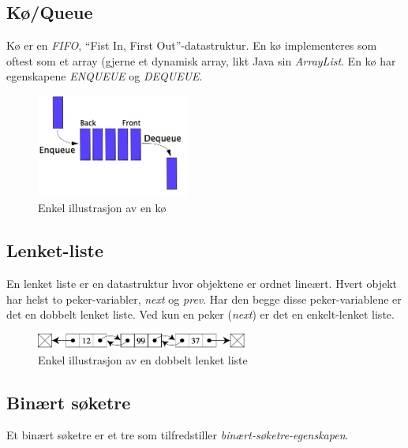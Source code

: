 \documentclass[a4paper, norsk,  10pt]{article}
\begin{document}
{{\subsection{Kø/Queue}

Kø er en \textit{FIFO}, ``Fist In, First Out''-datastruktur. En kø implementeres som oftest som et array (gjerne et dynamisk array, likt Java sin \textit{ArrayList}. En kø har egenskapene \textit{ENQUEUE} og \textit{DEQUEUE}.

\begin{figure}[hbt]
    \begin{center}
        \includegraphics[width=5cm] {ko.png}
        \caption{Enkel illustrasjon av en kø}
    \end{center}
\end{figure}

\subsection{Lenket-liste}

En lenket liste er en datastruktur hvor objektene er ordnet lineært. Hvert objekt har helst to peker-variabler, \textit{next} og \textit{prev}. Har den begge disse peker-variablene er det en dobbelt lenket liste. Ved kun en peker (\textit{next}) er det en enkelt-lenket liste. 

\begin{figure}[hbt]
    \begin{center}
        \includegraphics[width=7cm] {linked.png}
        \caption{Enkel illustrasjon av en dobbelt lenket liste}
    \end{center}
\end{figure}

\subsection{Binært søketre}

Et binært søketre er et tre som tilfredstiller \textit{binært-søketre-egenskapen}. 

}}
\end{document}
